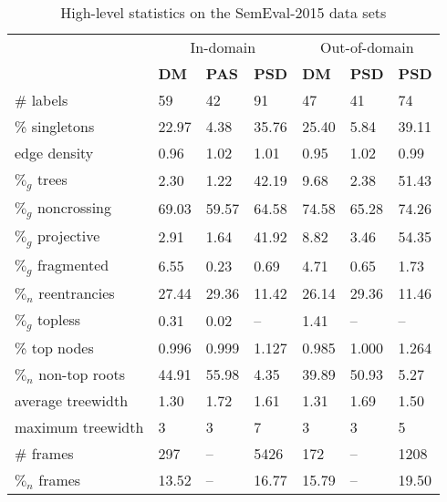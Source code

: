 \begin{table}
    \centering
    \smaller[0.2]
    \begin{tabular}{@{}lllllll@{}}
        \toprule
        & \multicolumn{3}{c}{In-domain}
        & \multicolumn{3}{c}{Out-of-domain} \\
        \cmidrule(lr){2-4}
        \cmidrule(lr){5-7}
        \textbf{} & \textbf{DM} & \textbf{PAS} & \textbf{PSD} &
        \textbf{DM} & \textbf{PSD} & \textbf{PSD} \\
        \midrule
        \# labels & 59 & 42 & 91 & 47 & 41 & 74 \\
        \% singletons & 22.97 & 4.38 & 35.76 & 25.40 & 5.84 & 39.11 \\
        edge density & 0.96 & 1.02 & 1.01 &  0.95 & 1.02 & 0.99 \\
        $\%_g$ trees & 2.30 & 1.22 & 42.19 & 9.68 & 2.38 & 51.43 \\
        $\%_g$ noncrossing & 69.03 & 59.57 & 64.58 & 74.58 & 65.28 & 74.26 \\
        $\%_g$ projective & 2.91 & 1.64 & 41.92 & 8.82 & 3.46 & 54.35 \\
        $\%_g$ fragmented & 6.55 & 0.23 & 0.69 & 4.71 & 0.65 & 1.73 \\
        $\%_n$ reentrancies & 27.44 & 29.36 & 11.42 & 26.14 & 29.36 & 11.46 \\
        $\%_g$ topless & 0.31 & 0.02 & – & 1.41 & – & – \\
        \% top nodes & 0.996 & 0.999 & 1.127 & 0.985 & 1.000 & 1.264 \\
        $\%_n$ non-top roots & 44.91 & 55.98 & 4.35 & 39.89 & 50.93 & 5.27 \\
        average treewidth & 1.30 & 1.72 & 1.61 & 1.31 & 1.69 & 1.50  \\
        maximum treewidth & 3 & 3 & 7  & 3 & 3 & 5 \\
        \midrule
        \# frames & 297 & – & 5426  & 172 & – & 1208 \\
        $\%_n$ frames & 13.52 & – & 16.77 & 15.79 & – & 19.50 \\
        \bottomrule
    \end{tabular}
    \caption{High-level statistics on the SemEval-2015 data sets}
    \label{fig:data}
\end{table}


